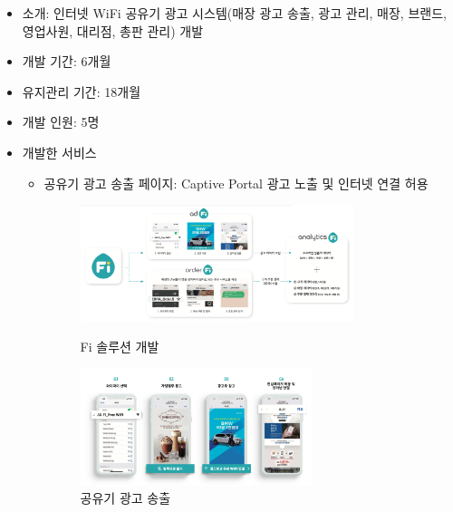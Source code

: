 
\label{adfi}

\begin{itemize}[label=]
	\item 소개: 인터넷 WiFi 공유기 광고 시스템(매장 광고 송출, 광고 관리, 매장, 브랜드, 영업사원, 대리점, 총판 관리) 개발
	\item 개발 기간: 6개월
	\item 유지관리 기간: 18개월
	\item 개발 인원: 5명
	\item 개발한 서비스
	      \begin{itemize}[label=]
		      \item 공유기 광고 송출 페이지: Captive Portal 광고 노출 및 인터넷 연결 허용
		            \begin{figure}[!ht]
			            \begin{fullwidth}
				            \parbox{0.8\textwidth}{
					            \centering
					            \includegraphics[width=0.8\textwidth]{images/ad-fi-platform.png}
					            \caption*{Fi 솔루션 개발}
				            }\qquad
				            \parbox{0.68\textwidth}{
					            \centering
					            \includegraphics[width=0.68\textwidth]{images/ad-fi.png}
					            \caption*{공유기 광고 송출}
				            }
			            \end{fullwidth}
		            \end{figure}

\end{itemize}
\end{itemize}
